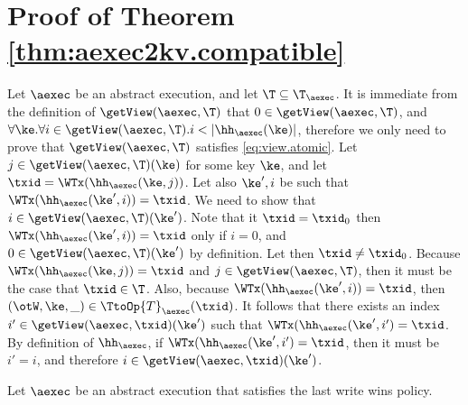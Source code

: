 \section{Proof of Theorem \ref{thm:aexec2kv.compatible}}
\label{app:aexec2kv}

Let $\aexec$ be an abstract execution, and let 
$\T \subseteq \T_{\aexec}$. 
It is immediate from the definition of $\getView(\aexec, \T)$ that 
$0 \in \getView(\aexec, \T)$, and $\forall \ke.\forall i \in \getView(\aexec, \T). i < \lvert \hh_{\aexec}(\ke) \rvert$, 
therefore we only need to prove that $\getView(\aexec, \T)$ satisfies \eqref{eq:view.atomic}.
Let $j \in \getView(\aexec, \T)(\ke)$ for some key $\ke$, and let $\txid = 
\WTx(\hh_{\aexec}(\ke, j))$. Let also $\ke', i$ be such that 
$\WTx(\hh_{\aexec}(\ke', i)) = \txid$. We need to show that 
$i \in \getView(\aexec, \T)(\ke')$. Note that it $\txid = \txid_{0}$ 
then $\WTx(\hh_{\aexec}(\ke', i)) = \txid$ only if $i = 0$, and 
$0 \in \getView(\aexec, \T)(\ke')$ by definition. 
Let then $\txid \neq \txid_{0}$. Because $\WTx(\hh_{\aexec}(\ke, j)) = \txid$ 
and $j \in \getView(\aexec, \T)$, then it must be the case that $\txid \in \T$. 
Also, because $\WTx(\hh_{\aexec}(\ke', i)) = \txid$, then $(\otW, \ke, \_) \in 
\TtoOp{T}_{\aexec}(\txid)$. It follows that there exists an index $i' \in \getView(\aexec, \txid)(\ke')$ 
such that $\WTx(\hh_{\aexec}(\ke', i') = \txid$. By definition of 
$\hh_{\aexec}$, if $\WTx(\hh_{\aexec}(\ke', i') = \txid$, then it must 
be $i' = i$, and therefore $i \in \getView(\aexec, \txid)(\ke')$.

Let $\aexec$ be an abstract execution that satisfies the last write wins 
policy.


